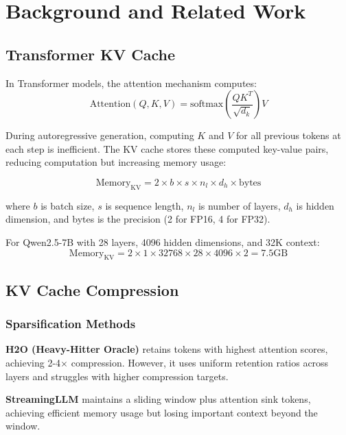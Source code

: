 \documentclass{article}
\begin{document}
\section{Background and Related Work}

\subsection{Transformer KV Cache}

In Transformer models, the attention mechanism computes:
\begin{equation}
\text{Attention}(Q, K, V) = \text{softmax}\left(\frac{QK^T}{\sqrt{d_k}}\right)V
\end{equation}

During autoregressive generation, computing $K$ and $V$ for all previous tokens at each step is inefficient. The KV cache stores these computed key-value pairs, reducing computation but increasing memory usage:

\begin{equation}
\text{Memory}_{\text{KV}} = 2 \times b \times s \times n_l \times d_h \times \text{bytes}
\end{equation}

where $b$ is batch size, $s$ is sequence length, $n_l$ is number of layers, $d_h$ is hidden dimension, and bytes is the precision (2 for FP16, 4 for FP32).

For Qwen2.5-7B with 28 layers, 4096 hidden dimensions, and 32K context:
\begin{equation}
\text{Memory}_{\text{KV}} = 2 \times 1 \times 32768 \times 28 \times 4096 \times 2 = 7.5\text{GB}
\end{equation}

\subsection{KV Cache Compression}

\subsubsection{Sparsification Methods}

\textbf{H2O (Heavy-Hitter Oracle)} retains tokens with highest attention scores, achieving 2-4$\times$ compression. However, it uses uniform retention ratios across layers and struggles with higher compression targets.

\textbf{StreamingLLM} maintains a sliding window plus attention sink tokens, achieving efficient memory usage but losing important context beyond the window.
\end{document}
